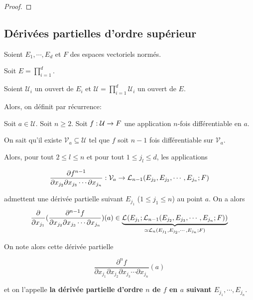 \ifdefined\outputproof
\begin{proof}

\end{proof}
\fi

\subsection{Dérivées partielles d'ordre supérieur}

Soient $E_{1}, \cdots, E_{d}$ et $F$ des espaces vectoriels normés.

Soit $E = \displaystyle \prod_{i = 1}^{d}$.

Soient $\mathcal{U}_{i}$ un ouvert de $E_{i}$ et $\mathcal{U} = \displaystyle
\prod_{i = 1}^{d} \mathcal{U}_{i}$ un ouvert de $E$.

Alors, on définit par récurrence:

\begin{definition}
	Soit $a \in \mathcal{U}$.
	Soit $n \geq 2$. Soit $\GSfunction{f}{\mathcal{U}}{F}$ une application
	$n$-fois différentiable en $a$.

	On sait qu'il existe $\mathcal{V}_{a} \subseteq \mathcal{U}$ tel que $f$
	soit $n - 1$ fois différentiable sur $\mathcal{V}_{a}$.

	Alors, pour tout $2 \leq l \leq n$ et pour tout $1 \leq j_{l} \leq d$, les
	applications

	\begin{equation*}
		\frac{\partial f^{n - 1}}{\partial x_{j_{2}} \partial x_{j_{3}} \cdots
		\partial x_{j_{n}}} : \mathcal{V}_{a} \rightarrow \GScontinueHomo[n -
		1]{E_{j_{2}}, E_{j_{3}}, \cdots, E_{j_{n}}}{F}
	\end{equation*}

	admettent une dérivée partielle suivant $E_{j_{1}}$ ($1 \leq j_{1} \leq
	n$) au point $a$. On a alors
	\begin{equation*}
		\frac{\partial}{\partial x_{j_{1}}} (
		\frac{\partial^{n - 1} f}{\partial x_{j_{2}} \partial x_{j_{3}} \cdots
		\partial x_{j_{n}}}) (a) \in
		\underbrace{\GScontinueHomo{E_{j_{1}}}{\GScontinueHomo[n -
		1]{E_{j_{2}}, E_{j_{3}}, \cdots, E_{j_{n}}}{F}}}_{\isomorphe
			\GScontinueHomo[n]{E_{j_{1}}, E_{j_{2}}, \cdots, E_{j_{n}}}{F}}
	\end{equation*}

	On note alors cette dérivée partielle

	\begin{equation*}
		\frac{\partial^{n} f}{\partial x_{j_{1}} \partial x_{j_{2}} \partial x_{j_{3}} \cdots
		\partial x_{j_{n}}} (a)
	\end{equation*}

	et on l'appelle \textbf{la dérivée partielle d'ordre $n$ de $f$ en $a$
		suivant $E_{j_{1}}, \cdots, E_{j_{n}}$}.
\end{definition}

